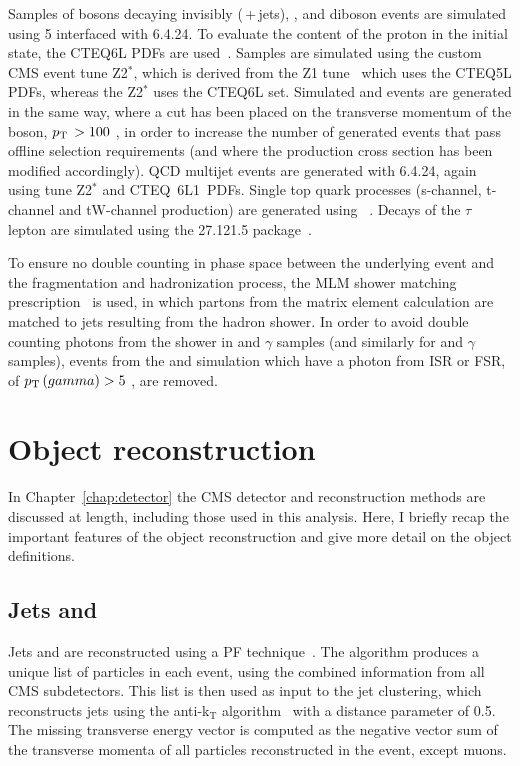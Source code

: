 Samples of \Z bosons decaying invisibly (\znunubr{}\,+\,jets), \ttbar, and diboson events 
are simulated using \MADGRAPH{}5 interfaced with \PYTHIA{}6.4.24. 
To evaluate the content of the proton in the initial state, the CTEQ6L \ac{PDFs} are used~\cite{CTEQ6}. 
Samples are simulated using the custom CMS event tune Z2$^{*}$, which is derived from the Z1 tune~\cite{pythia-z2} which uses the CTEQ5L \ac{PDFs}, whereas the Z2$^{*}$ uses the CTEQ6L set.
Simulated \zpj{} and \wpj{} events are generated in the same way, where a cut has been placed on the transverse momentum of the boson, $p_{\text{T}}\, > 100$ \GeV, in order to increase the number of generated events that pass offline selection requirements (and where the production cross section has been modified accordingly).
QCD multijet events are generated with \PYTHIA{}6.4.24, again using tune Z2$^{*}$ and CTEQ~6L1~\ac{PDFs}. 
Single top quark processes (s-channel, t-channel and tW-channel production) are generated using \POWHEG~\cite{powheg_st,powheg_tw}.
Decays of the $\tau$ lepton are simulated using the \TAUOLA{} 27.121.5 package~\cite{TAUOLA}. 

To ensure no double counting in phase space between the underlying event and the fragmentation and hadronization process, the MLM shower matching prescription~\cite{bib:GEN_MLM} is used, in which partons from the matrix element calculation are matched to jets resulting from the hadron shower.
In order to avoid double counting photons from the \PYTHIA shower in \wpj{} and \W$\gamma$ samples (and similarly for \zpj{} and \Z$\gamma$ samples), 
events from the \wpj{} and \zpj{} simulation which have a photon from \ac{ISR} or \ac{FSR}, of $p_{\text{T}}\,(gamma)>5$ \GeV, are removed.


\section{Object reconstruction}

In Chapter~\ref{chap:detector} the CMS detector and reconstruction methods are discussed at length, including those used in this analysis. 
Here, I briefly recap the important features of the object reconstruction and give more detail on the object definitions.

\subsection{Jets and \MET}

Jets and \MET are reconstructed using a \ac{PF}
technique~\cite{PFT-09-001}. The algorithm produces a unique list 
of particles in each event, using the combined information from all 
CMS subdetectors. This list is then used as input to the jet 
clustering, which reconstructs jets using the anti-k$_{\mathrm{T}}$
algorithm~\cite{bib:akjets} with a distance parameter of 0.5.  
The missing transverse energy vector is computed as the negative vector 
sum of the transverse momenta of all particles reconstructed in the 
event, except muons.



